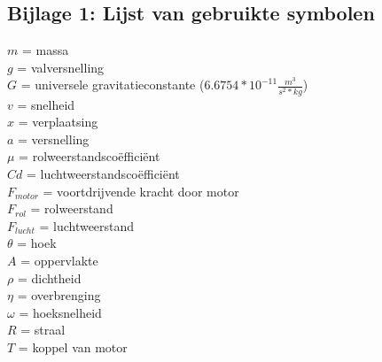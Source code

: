 \subsection{Bijlage 1: Lijst van gebruikte symbolen}
$m$ = massa\\
$g$ = valversnelling\\
$G$ = universele gravitatieconstante ($6.6754*10^{-11} \frac{m^3}{s^2*kg}$)\\
$v$ = snelheid\\
$x$ = verplaatsing\\
$a$ = versnelling\\
$\mu$ = rolweerstandsco\"effici\"ent\\ 
$Cd$ = luchtweerstandsco\"effici\"ent\\
$F_{motor}$ = voortdrijvende kracht door motor\\
$F_{rol}$ = rolweerstand\\
$F_{lucht}$ = luchtweerstand\\
$\theta$ = hoek\\
$A$ = oppervlakte\\
$\rho$ = dichtheid\\
$\eta$ = overbrenging\\
$\omega$ = hoeksnelheid\\
$R$ = straal\\
$T$ = koppel van motor\\
